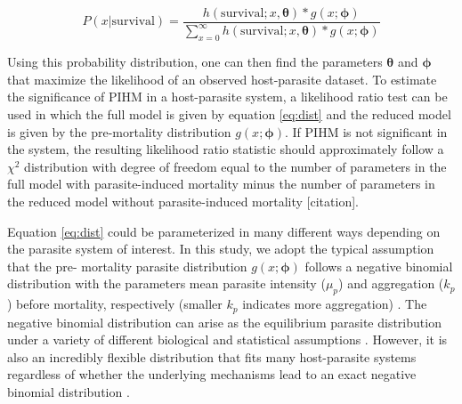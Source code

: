 \documentclass[12pt, a4paper]{article}
\begin{document}
\begin{equation}
    P(x | \text{survival}) = \dfrac{h(\text{survival}; x, \boldsymbol{\theta})  * g(x; \boldsymbol{\phi})}{\sum_{x=0}^{\infty} h(\text{survival}; x, \boldsymbol{\theta})  * g(x; \boldsymbol{\phi})}
    \label{eq:dist}
\end{equation}


Using this probability distribution, one can then find the parameters $\boldsymbol{\theta}$
and $\boldsymbol{\phi}$ that maximize the likelihood of an observed host-parasite dataset.
To estimate the significance of PIHM in a host-parasite system, a likelihood
ratio test can be used in which the full model is given by equation
\ref{eq:dist} and the reduced model is given by the pre-mortality distribution
$g(x; \boldsymbol{\phi})$.  If PIHM is not significant in the system, the resulting
likelihood ratio statistic should approximately follow a $\chi^2$ distribution
with degree of freedom equal to the number of parameters in the full model with parasite-induced mortality minus the number of parameters in the reduced model without parasite-induced mortality [citation].

Equation \ref{eq:dist} could be parameterized in many different ways depending
on the parasite system of interest. In this study, we adopt the typical assumption that the pre-
mortality parasite distribution $g(x; \boldsymbol{\phi})$ follows a negative binomial
distribution with the parameters mean parasite intensity ($\mu_p$) and
aggregation ($k_p$) before mortality, respectively (smaller $k_p$ indicates
more aggregation) \citep{Crofton1971a,AndersonandMay1978,Adjei1986}.   The negative binomial distribution can arise as the equilibrium parasite
distribution under a variety of different biological and statistical assumptions
\citep{Kendall1948a, Boswell1970, Calabrese2011}. However, it is also an incredibly flexible
distribution that fits many host-parasite systems regardless of whether the
underlying mechanisms lead to an exact negative binomial distribution
\citep{Shaw1998}.
\end{document}
